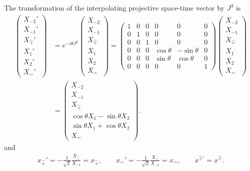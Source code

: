 \documentclass[foundations,article,submit,pdftex,moreauthors]{Definitions/mdpi}
\begin{document}
The transformation of the interpolating projective space-time vector by
$J^3$ is
\begin{align}
\begin{pmatrix}
X_{-2}'\\ X_{-1}'\\ X_{\hat{+}}'\\ X_1'\\ X_2'\\ X_{\hat{-}}'
\end{pmatrix}
&=e^{-i\theta J^3}
\begin{pmatrix}
X_{-2}\\ X_{-1}\\ X_{\hat{+}}\\ X_1\\ X_2\\ X_{\hat{-}}
\end{pmatrix}
=\begin{pmatrix}
1 & 0 & 0 & 0 & 0 & 0\\
0 & 1 & 0 & 0 & 0 & 0\\
0 & 0 & 1 & 0 & 0 & 0\\
0 & 0 & 0 & \cos\theta & -\sin\theta & 0\\
0 & 0 & 0 & \sin\theta & \cos\theta & 0\\
0 & 0 & 0 & 0 & 0 & 1
\end{pmatrix}
\begin{pmatrix}
X_{-2}\\ X_{-1}\\ X_{\hat{+}}\\ X_1\\ X_2\\ X_{\hat{-}}
\end{pmatrix}\\
&=\begin{pmatrix}
X_{-2}\\
X_{-1}\\
X_{\hat{+}}\\
\cos\theta X_1-\sin\theta X_2\\
\sin\theta X_1+\cos\theta X_2\\
X_{\hat{-}}
\end{pmatrix}.
\end{align}
and
\begin{align}
x_{\hat{+}}'=-\frac{1}{\sqrt{2}}\frac{X_{\hat{+}}}{X_{-1}}=x_{\hat{+}},\qquad
x_{\hat{-}}'=-\frac{1}{\sqrt{2}}\frac{X_{\hat{-}}}{X_{-1}}=x_{\hat{-}},\qquad
x^{\hat{+}\prime}=x^{\hat{+}}.
\end{align}
\end{document}
